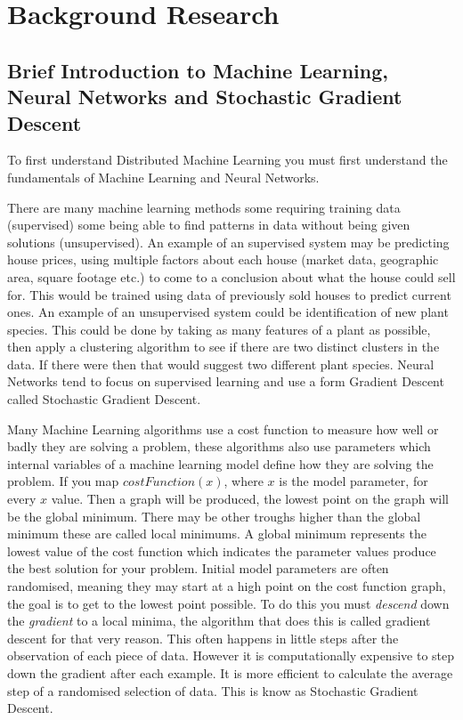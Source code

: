 \clearpage
\section{Background Research}
\subsection{Brief Introduction to Machine Learning, Neural Networks and Stochastic Gradient Descent}
To first understand Distributed Machine Learning you must first understand the
fundamentals of Machine Learning and Neural Networks. 

There are many machine learning methods some requiring training data
(supervised) some being able to find patterns in data without being given
solutions (unsupervised). \cite{alpaydin2020introduction} An example of an
supervised system may be predicting house prices, using multiple factors about
each house (market data, geographic area, square footage etc.) to come to a
conclusion about what the house could sell for. This would be trained using data
of previously sold houses to predict current ones. An example of an unsupervised
system could be identification of new plant species. This could be done by
taking as many features of a plant as possible, then apply a clustering
algorithm to see if there are two distinct clusters in the data. If there were
then that would suggest two different plant species. Neural Networks tend to
focus on supervised learning and use a form Gradient Descent called Stochastic
Gradient Descent.

Many Machine Learning algorithms use a cost function to measure how well or
badly they are solving a problem, these algorithms also use parameters which
internal variables of a machine learning model define how they are solving the
problem. If you map \(costFunction(x)\), where \(x\) is the model parameter, for
every \(x\) value. Then a graph will be produced, the lowest point on the graph
will be the global minimum. There may be other troughs higher than the global
minimum these are called local minimums. A global minimum represents the lowest
value of the cost function which indicates the parameter values produce the best
solution for your problem. Initial model parameters are often randomised,
meaning they may start at a high point on the cost function graph, the goal is
to get to the lowest point possible. To do this you must \textit{descend} down
the \textit{gradient} to a local minima, the algorithm that does this is called
gradient descent for that very reason. This often happens in little steps after
the observation of each piece of data. However it is computationally expensive
to step down the gradient after each example. It is more efficient to calculate
the average step of a randomised selection of data. This is know as Stochastic
Gradient Descent.

